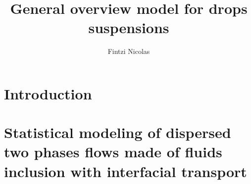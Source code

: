 \documentclass[12pt,a4paper,oneside,openany]{My_book}
\title{General overview model for drops suspensions}
\author{Fintzi Nicolas}
\begin{document}
\dominitoc

\frontmatter
\pagestyle{plain}




\mainmatter

\part{Introduction}



\part{Statistical modeling of dispersed two phases flows made of fluids inclusion with interfacial transport}

\adjustmtc
\end{document}
